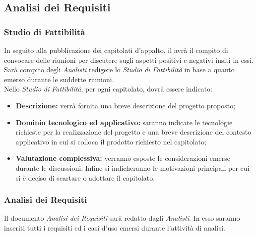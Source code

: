 \subsection{Analisi dei Requisiti}
\label{analisi}

\subsubsection{Studio di Fattibilità}
\label{studio_di_fattibilità}
In seguito alla pubblicazione dei capitolati d'appalto, il \projectManager{} avrà il compito di convocare delle riunioni per discutere sugli aspetti positivi e negativi insiti in essi. Sarà compito degli \emph{Analisti} redigere lo \emph{Studio di Fattibilità} in base a quanto emerso durante le suddette riunioni.
\\Nello \emph{Studio di Fattibilità}, per ogni capitolato, dovrà essere indicato:
\begin{itemize}
\item\textbf{Descrizione:} verrà fornita una breve descrizione del progetto proposto;
\item\textbf{Dominio tecnologico ed applicativo:} saranno indicate le tecnologie richieste per la realizzazione del progetto e una breve descrizione del contesto applicativo in cui si colloca il prodotto richiesto nel capitolato;
\item\textbf{Valutazione complessiva:} verranno esposte le considerazioni emerse durante le discussioni. Infine si indicheranno le motivazioni principali per cui si è deciso di scartare o adottare il capitolato.
\end{itemize}

\subsubsection{Analisi dei Requisiti}
\label{analisi_req}
Il documento \emph{Analisi dei Requisiti} sarà redatto dagli \emph{Analisti}. In esso saranno inseriti tutti i requisiti ed i casi d'uso\glossario{} emersi durante l'attività di analisi.


